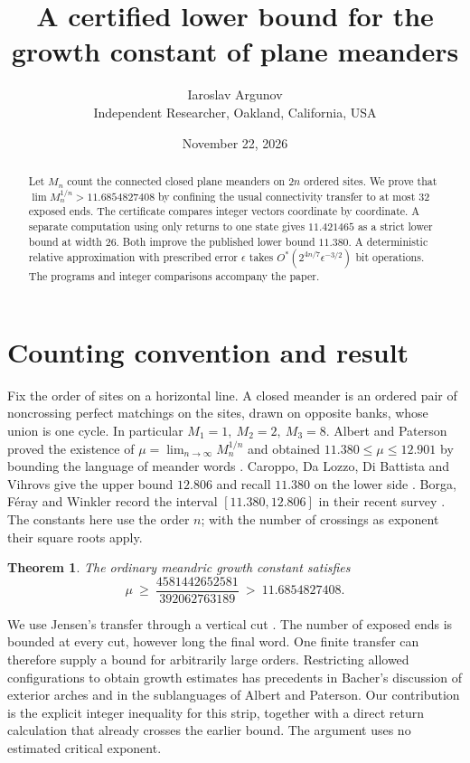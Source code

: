 \documentclass[11pt]{article}
\title{\bfseries A certified lower bound for the growth constant of plane meanders}
\author{Iaroslav Argunov\\{\small Independent Researcher, Oakland, California, USA}}
\date{November 22, 2026}
\newtheorem{theorem}{Theorem}
\newcommand{\result}{11.6854827408}
\newcommand{\wnum}{4581442652581}
\newcommand{\wden}{392062763189}
\begin{document}
\maketitle
\begin{abstract}
Let \(M_n\) count the connected closed plane meanders on \(2n\) ordered sites. We prove that \(\lim M_n^{1/n}>\result\) by confining the usual connectivity transfer to at most 32 exposed ends. The certificate compares integer vectors coordinate by coordinate. A separate computation using only returns to one state gives \(11.421465\) as a strict lower bound at width 26. Both improve the published lower bound \(11.380\). A deterministic relative approximation with prescribed error \(\epsilon\) takes \(O^*(2^{4n/7}\epsilon^{-3/2})\) bit operations. The programs and integer comparisons accompany the paper.
\end{abstract}

\section{Counting convention and result}
Fix the order of sites on a horizontal line. A closed meander is an ordered pair of noncrossing perfect matchings on the sites, drawn on opposite banks, whose union is one cycle. In particular \(M_1=1,\ M_2=2,\ M_3=8\). Albert and Paterson proved the existence of
\(\mu=\lim_{n\to\infty}M_n^{1/n}\) and obtained \(11.380\le\mu\le12.901\) by bounding the language of meander words \cite{ap}. Caroppo, Da Lozzo, Di Battista and Vihrovs give the upper bound \(12.806\) and recall \(11.380\) on the lower side \cite{caroppo}. Borga, F\'eray and Winkler record the interval \([11.380,12.806]\) in their recent survey \cite[p.~41]{bfw}. The constants here use the order \(n\); with the number of crossings as exponent their square roots apply.

\begin{theorem}\label{main}
The ordinary meandric growth constant satisfies
\[
             \mu\ \ge\ \frac{\wnum}{\wden}\ >\ \result .
\]
\end{theorem}

We use Jensen's transfer through a vertical cut \cite{jensen}. The number of exposed ends is bounded at every cut, however long the final word. One finite transfer can therefore supply a bound for arbitrarily large orders. Restricting allowed configurations to obtain growth estimates has precedents in Bacher's discussion of exterior arches \cite{bacher} and in the sublanguages of Albert and Paterson. Our contribution is the explicit integer inequality for this strip, together with a direct return calculation that already crosses the earlier bound. The argument uses no estimated critical exponent.
\end{document}
